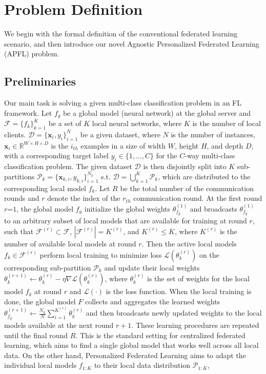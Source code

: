 



\section{Problem Definition}
\label{sec:def}
We begin with the formal definition of the conventional federated learning scenario, and then introduce our novel Agnostic Personalized Federated Learning (APFL) problem. 


\subsection{Preliminaries}
\label{subsec:fl}
Our main task is solving a given multi-class classification problem in an FL framework. Let $f_g$ be a global model (neural network) at the global server and $\mathcal{F}=\{f_k\}^{K}_{k=1}$ be a set of $K$ local neural networks, where $K$ is the number of local clients.  $\mathcal{D}=\{\textbf{x}_{i}, y_{i}\}^{N}_{i=1}$ be a given dataset, where $N$ is the number of instances, $\textbf{x}_i \in \mathbb{R}^{W \times H \times D}$ is the $i_{th}$ examples in a size of width $W$, height $H$, and depth $D$, with a corresponding target label $y_i \in \{1,\dots,C\}$ for the $C$-way multi-class classification problem. The given dataset $\mathcal{D}$ is then disjointly split into $K$ sub-partitions $\mathcal{P}_{k}=\{\textbf{x}_{k,i}, y_{k,i}\}^{N_{k}}_{i=1}$ s.t. $\mathcal{D} = \bigcup_{k=1}^{K} \mathcal{P}_{k}$, which are distributed to the corresponding local model $f_k$. Let $R$ be the total number of the communication rounds and $r$ denote the index of the $r_{th}$ communication round. At the first round $r$=$1$, the global model $f_g$ initialize the global weights $\theta^{(1)}_{f_g}$ and broadcasts $\theta^{(1)}_{f_g}$ to an arbitrary subset of local models that are available for training at round $r$, such that $\mathcal{F}^{(r)}\subset\mathcal{F}$, $|\mathcal{F}^{(r)}|=K^{(r)}$, and $K^{(r)} \leq K$, where $K^{(r)}$ is the number of available local models at round $r$. Then the active local models $f_{k}\in\mathcal{F}^{(r)}$ perform local training to minimize loss $\mathcal{L}( \theta^{(r)}_{k})$ on the corresponding sub-partition $\mathcal{P}_{k}$ and update their local weights $\theta^{(r+1)}_{k} \leftarrow \theta^{(r)}_{k}-\eta\nabla\mathcal{L}(\theta^{(r)}_{k})$, where $\theta^{(r)}_{k}$ is the set of weights for the local model $f_k$ at round $r$ and $\mathcal{L}(\cdot)$ is the loss function. When the local training is done, the global model $F$ collects and aggregates the learned weights $\theta^{(r+1)}_{f_g} \leftarrow \frac{N_{k}}{N}\sum_{i=1}^{K^{(r)}} \theta_{k}^{(r)}$ and then broadcasts newly updated weights to the local models available at the next round $r+1$. These learning procedures are repeated until the final round $R$. This is the standard setting for centralized federated learning, which aims to find a single global model that works well across all local data. On the other hand, Personalized Federated Learning aims to adapt the individual local models $f_{1:K}$ to their local data distribution $\mathcal{P}_{1:K}$, 